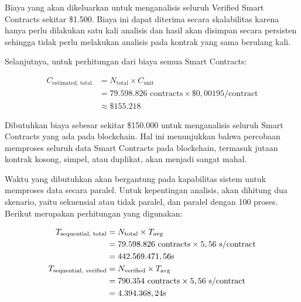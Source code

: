 Biaya yang akan dikeluarkan untuk menganalisis seluruh Verified Smart Contracts sekitar \$1.500. Biaya ini dapat diterima secara skalabilitas karena hanya perlu dilakukan satu kali analisis dan hasil akan disimpan secara persisten sehingga tidak perlu melakukan analisis pada kontrak yang sama berulang kali.

Selanjutnya, untuk perhitungan dari biaya semua Smart Contracts:

\begin{align*}
	C_{\text{estimated, total}} & = N_{\text{total}} \times C_{\text{unit}}                       \\
	                            & = 79.598.826 \text{ contracts} \times \$0,00195/\text{contract} \\
	                            & \approx \$155.218
\end{align*}

Dibutuhkan biaya sebesar sekitar \$150.000 untuk menganalisis seluruh Smart Contracts yang ada pada blockchain. Hal ini menunjukkan bahwa percobaan memproses seluruh data Smart Contracts pada blockchain, termasuk jutaan kontrak kosong, simpel, atau duplikat, akan menjadi sangat mahal.


Waktu yang dibutuhkan akan bergantung pada kapabilitas sistem untuk memproses data secara paralel. Untuk kepentingan analisis, akan dihitung dua skenario, yaitu sekuensial atau tidak paralel, dan paralel dengan 100 proses. Berikut merupakan perhitungan yang digunakan:

\begin{align*}
	T_{\text{sequential, total}}    & = N_{\text{total}} \times T_{\text{avg}}                                    \\
	                                & = 79.598.826 \text{ contracts} \times 5,56 \text{ \text{s}/\text{contract}} \\
	                                & = 442.569.471,56 \text{s}                                                   \\
	T_{\text{sequential, verified}} & = N_{\text{verified}} \times T_{\text{avg}}                                 \\
	                                & = 790.354 \text{ contracts} \times 5,56 \text{ \text{s}/\text{contract}}    \\
	                                & = 4.394.368,24 \text{s}
\end{align*}

